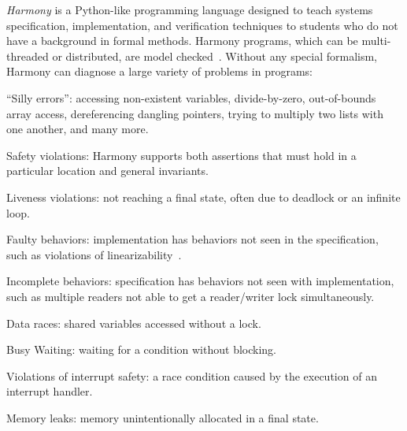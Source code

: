 \documentclass[twocolumn]{article}
\begin{document}
\emph{Harmony} is a Python-like programming language designed to teach
systems specification, implementation, and verification techniques to
students who do not have a background in formal methods.
Harmony programs, which can be multi-threaded
or distributed, are model checked~\cite{CES86}.
Without any special formalism, Harmony can diagnose a large variety
of problems in programs:
\begin{compactitem}
\item ``Silly errors'': accessing non-existent variables,
divide-by-zero, out-of-bounds array access, dereferencing dangling
pointers, trying to multiply two lists with one another,
and many more.
\item Safety violations: Harmony supports both assertions that must hold in a particular location and general invariants.
\item Liveness violations: not reaching a final state, often due to deadlock or an infinite loop.
\item Faulty behaviors: implementation has behaviors not seen in the specification, such as violations of linearizability~\cite{HW90}.
\item Incomplete behaviors: specification has behaviors not seen with implementation, such as multiple readers not able to get a reader/writer lock simultaneously.
\item Data races: shared variables accessed without a lock.
\item Busy Waiting: waiting for a condition without blocking.
\item Violations of interrupt safety: a race condition caused by the execution
of an interrupt handler.
\item Memory leaks: memory unintentionally allocated in a final state.
\end{compactitem}
\end{document}
